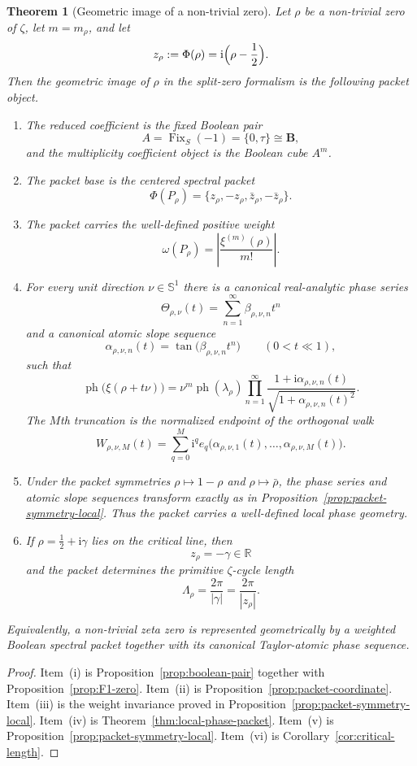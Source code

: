 \documentclass[11pt]{amsart}
\numberwithin{equation}{section}
\newtheorem{theorem}{Theorem}[section]
\theoremstyle{definition}
\theoremstyle{remark}
\DeclareMathOperator{\Fix}{Fix}
\newcommand{\RR}{\mathbb R}
\newcommand{\BB}{\mathbf B}
\newcommand{\Sph}{\mathbb S^1}
\newcommand{\ph}{\operatorname{ph}}
\newcommand{\taup}{\tau}
\newcommand{\ii}{\mathrm i}
\begin{document}
\begin{theorem}[Geometric image of a non-trivial zero]\label{thm:final}
Let $\rho$ be a non-trivial zero of $\zeta$, let $m=m_\rho$, and let
\[
z_\rho:=\Phi(\rho)=\ii\Bigl(\rho-\frac12\Bigr).
\]
Then the geometric image of $\rho$ in the split-zero formalism is the following packet object.
\begin{enumerate}[label=(\roman*)]
\item The reduced coefficient is the fixed Boolean pair
\[
A=\Fix_S(-1)=\{0,\taup\}\cong\BB,
\]
and the multiplicity coefficient object is the Boolean cube $A^m$.
\item The packet base is the centered spectral packet
\[
\Phi(P_\rho)=\{z_\rho,-z_\rho,\bar z_\rho,-\bar z_\rho\}.
\]
\item The packet carries the well-defined positive weight
\[
\omega(P_\rho)=\left|\frac{\xi^{(m)}(\rho)}{m!}\right|.
\]
\item For every unit direction $\nu\in\Sph$ there is a canonical real-analytic phase series
\[
\Theta_{\rho,\nu}(t)=\sum_{n=1}^{\infty}\beta_{\rho,\nu,n}t^n
\]
and a canonical atomic slope sequence
\[
\alpha_{\rho,\nu,n}(t)=\tan\bigl(\beta_{\rho,\nu,n}t^n\bigr)
\qquad (0<t\ll1),
\]
such that
\[
\ph\bigl(\xi(\rho+t\nu)\bigr)=\nu^m\ph(\lambda_\rho)
\prod_{n=1}^{\infty}\frac{1+\ii\alpha_{\rho,\nu,n}(t)}{\sqrt{1+\alpha_{\rho,\nu,n}(t)^2}}.
\]
The $M$th truncation is the normalized endpoint of the orthogonal walk
\[
W_{\rho,\nu,M}(t)=\sum_{q=0}^M \ii^q e_q\bigl(\alpha_{\rho,\nu,1}(t),\dots,\alpha_{\rho,\nu,M}(t)\bigr).
\]
\item Under the packet symmetries $\rho\mapsto1-\rho$ and $\rho\mapsto\bar\rho$, the phase series and atomic slope sequences transform exactly as in Proposition~\ref{prop:packet-symmetry-local}.  Thus the packet carries a well-defined local phase geometry.
\item If $\rho=\tfrac12+\ii\gamma$ lies on the critical line, then
\[
z_\rho=-\gamma\in\RR
\]
and the packet determines the primitive $\zeta$-cycle length
\[
\Lambda_\rho=\frac{2\pi}{|\gamma|}=\frac{2\pi}{|z_\rho|}.
\]
\end{enumerate}
Equivalently, a non-trivial zeta zero is represented geometrically by a weighted Boolean spectral packet together with its canonical Taylor-atomic phase sequence.
\end{theorem}

\begin{proof}
Item~(i) is Proposition~\ref{prop:boolean-pair} together with Proposition~\ref{prop:F1-zero}.  Item~(ii) is Proposition~\ref{prop:packet-coordinate}.  Item~(iii) is the weight invariance proved in Proposition~\ref{prop:packet-symmetry-local}.  Item~(iv) is Theorem~\ref{thm:local-phase-packet}.  Item~(v) is Proposition~\ref{prop:packet-symmetry-local}.  Item~(vi) is Corollary~\ref{cor:critical-length}.
\end{proof}
\end{document}

